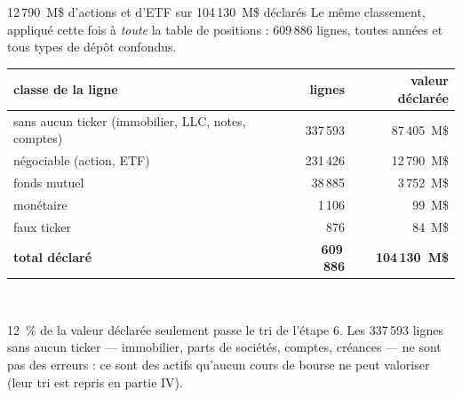 \documentclass[11pt,aspectratio=169]{beamer}
\newcommand{\defl}[1]{{\scriptsize\color{black!55}#1}}
\begin{document}
\begin{frame}{12\,790~M\$ d'actions et d'ETF sur 104\,130~M\$ déclarés}
  \footnotesize
  Le même classement, appliqué cette fois à \emph{toute} la table de positions : 609\,886 lignes,
  toutes années et tous types de dépôt confondus.
  \bigskip

  \centering
  \footnotesize
  \begin{tabular}{l r r}
    \toprule
    classe de la ligne & lignes & valeur déclarée \\
    \midrule
    sans aucun ticker \defl{(immobilier, LLC, notes, comptes)} & 337\,593 & 87\,405~M\$ \\
    négociable \defl{(action, ETF)}                            & 231\,426 & 12\,790~M\$ \\
    fonds mutuel                                               & 38\,885  & 3\,752~M\$ \\
    monétaire                                                  & 1\,106   & 99~M\$ \\
    faux ticker                                                & 876     & 84~M\$ \\
    \midrule
    \textbf{total déclaré} & \textbf{609\,886} & \textbf{104\,130~M\$} \\
    \bottomrule
  \end{tabular}\\[3mm]

  \raggedright
  \defl{12~\% de la valeur déclarée seulement passe le tri de l'étape 6. Les 337\,593 lignes sans
        aucun ticker --- immobilier, parts de sociétés, comptes, créances --- ne sont pas des
        erreurs : ce sont des actifs qu'aucun cours de bourse ne peut valoriser (leur tri est
        repris en partie IV).}
\end{frame}
\end{document}
